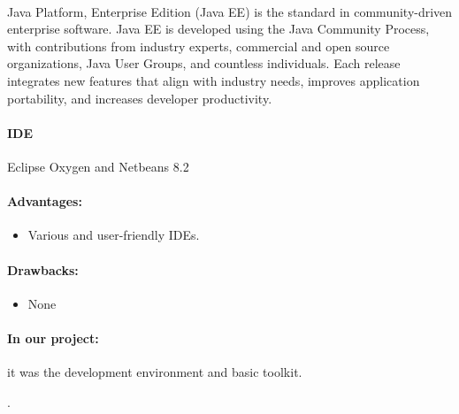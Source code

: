 \documentclass{article}
\begin{document}
		\paragraph{}Java Platform, Enterprise Edition (Java EE) is the standard in community-driven enterprise software. Java EE is developed using the Java Community Process, with contributions from industry experts, commercial and open source organizations, Java User Groups, and countless individuals. Each release integrates new features that align with industry needs, improves application portability, and increases developer productivity.
		\paragraph{IDE} Eclipse Oxygen and Netbeans 8.2
		\paragraph{Advantages:}
		\begin{itemize}
			\item{}Various and user-friendly IDEs.
		\end{itemize}
		\paragraph{Drawbacks:}
		\begin{itemize}
			\item{}None
		\end{itemize}
		\paragraph{In our project:} it was the development environment and basic toolkit.



		
			
.
		
\end{document}
